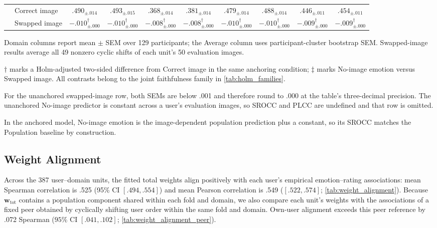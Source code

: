 \documentclass[10pt,twocolumn,letterpaper]{article}
\begin{document}
\begin{table}[!tbp]
\begin{threeparttable}
\begin{tabular}{ll cc cc cc cc}
    \addlinespace
    \multirow{2}{*}{Unanchored} & Correct image & $\bm{.490_{\pm .014}}$ & $\bm{.493_{\pm .015}}$ & $\bm{.368_{\pm .014}}$ & $\bm{.381_{\pm .014}}$ & $\bm{.479_{\pm .014}}$ & $\bm{.488_{\pm .014}}$ & $\bm{.446_{\pm .011}}$ & $\bm{.454_{\pm .011}}$ \\
    & Swapped image & $-.010_{\pm .000}^{\dagger}$ & $-.010_{\pm .000}^{\dagger}$ & $-.008_{\pm .000}^{\dagger}$ & $-.008_{\pm .000}^{\dagger}$ & $-.010_{\pm .000}^{\dagger}$ & $-.010_{\pm .000}^{\dagger}$ & $-.009_{\pm .000}^{\dagger}$ & $-.009_{\pm .000}^{\dagger}$ \\
    \bottomrule
    \end{tabular}
\begin{tablenotes}[flushleft]\footnotesize
    \item Domain columns report mean $\pm$ SEM over 129 participants; the Average
    column uses participant-cluster bootstrap SEM. Swapped-image results average
    all 49 nonzero cyclic shifts of each unit's 50 evaluation images.
    \item $\dagger$ marks a Holm-adjusted two-sided difference from Correct image
    in the same anchoring condition; $\ddagger$ marks No-image emotion versus
    Swapped image. All contrasts belong to the joint faithfulness family in
    \cref{tab:holm_families}.
    \item For the unanchored swapped-image row, both SEMs are below .001 and
    therefore round to .000 at the table's three-decimal precision.
    The unanchored No-image predictor is constant across a user's evaluation
    images, so SROCC and PLCC are undefined and that row is omitted.
    \item In the anchored model, No-image emotion is the image-dependent
    population prediction plus a constant, so its SROCC matches the Population
    baseline by construction.
\end{tablenotes}
\end{threeparttable}
\end{table}

\subsection{Weight Alignment}

Across the 387 user--domain units, the fitted total weights align positively
with each user's empirical emotion--rating associations: mean Spearman
correlation is .525 (95\% CI $[.494,.554]$) and mean Pearson correlation is
.549 ($[.522,.574]$; \cref{tab:weight_alignment}). Because
$\mathbf w_{\mathrm{tot}}$ contains a population component shared within each
fold and domain, we also compare each unit's weights with the associations of
a fixed peer obtained by cyclically shifting user order within the same fold
and domain. Own-user alignment exceeds this peer reference by .072 Spearman
($95\%$ CI $[.041,.102]$; \cref{tab:weight_alignment_peer}).
\end{document}
